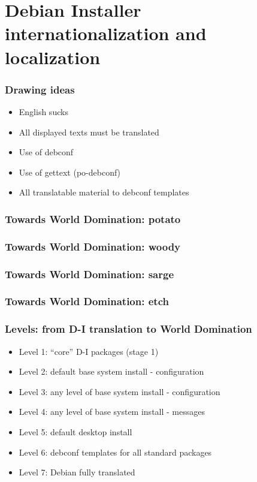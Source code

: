 \documentclass{beamer}
\begin{document}

\section{Debian Installer internationalization and localization}

\begin{frame}
  \frametitle{Drawing ideas}
	\begin{itemize}
	\item
		English sucks
	\item
		All displayed texts must be translated
	\item
		Use of debconf
	\item
		Use of gettext (po-debconf)
	\item
		All translatable material to debconf templates
	\end{itemize}
\end{frame}

\begin{frame}
  \frametitle{Towards World Domination: potato}
\end{frame}

\begin{frame}
  \frametitle{Towards World Domination: woody}
\end{frame}

\begin{frame}
  \frametitle{Towards World Domination: sarge}
\end{frame}

\begin{frame}
  \frametitle{Towards World Domination: etch}
\end{frame}

\begin{frame}
  \frametitle{Levels: from D-I translation to World Domination}
	\begin{itemize}
	\item
		Level 1: ``core'' D-I packages (stage 1)
	\item
		Level 2: default base system install - configuration
	\item
		Level 3: any level of base system install - configuration
	\item
		Level 4: any level of base system install - messages
	\item
		Level 5: default desktop install
	\item
		Level 6: debconf templates for all standard packages
	\item
		Level 7: Debian fully translated
	\end{itemize}
\end{frame}
\end{document}

